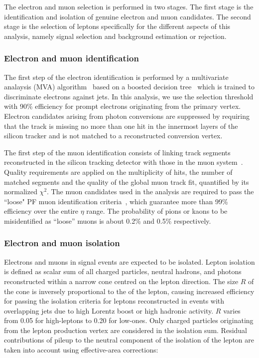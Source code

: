 The electron and muon selection is performed in two stages. The first stage is the identification and isolation of genuine electron and muon candidates. The second stage is the selection of leptons specifically for the different aspects of this analysis, namely signal selection and background estimation or rejection.

\subsubsection {Electron and muon identification}
\label{sec:basic_electronId}

The first step of the electron identification is performed by a multivariate analaysis (MVA) algorithm~\cite{Khachatryan:2015hwa,ElectronID} based on a boosted decision tree~\cite{TMVA} which is trained to discriminate electrons against jets. In this analysis, we use the selection threshold with 90\% efficiency for prompt electrons originating from the primary vertex.
Electron candidates arising from photon conversions are suppressed by requiring that the track is missing no more than one hit in the innermost layers of the silicon tracker and is not matched to a reconstructed conversion vertex.







The first step of the muon identification consists of linking track segments reconstructed in the silicon tracking detector with those in the muon system~\cite{Chatrchyan:2012xi}.
Quality requirements are applied on the multiplicity of hits, the number of matched segments and the quality of the global muon track fit, quantified by its normalized $\chi^{2}$.
The muon candidates used in the analysis are required to pass the ``loose" PF muon identification criteria~\cite{MuonID}, which guarantee more than 99\% efficiency over the entire $\eta$ range. The probability of pions or kaons to be misidentified as ``loose'' muons is about 0.2\% and 0.5\% respectively.

\subsubsection{Electron and muon isolation}
\label{sec:electronAndMuonIsolation}

Electrons and muons in signal events are expected to be isolated. Lepton isolation is defined as scalar \pt sum of all charged particles, neutral hadrons, and photons reconstructed within a narrow cone centred on the lepton direction.
The size $R$ of the cone is inversely proportional to the \pt of the lepton, causing increased efficiency for passing the isolation criteria for leptons reconstructed in events with overlapping jets due to high Lorentz boost or high hadronic activity. $R$ varies from 0.05 for high-\pt leptons to 0.20 for low-\pt ones.
Only charged particles originating from the lepton production vertex are considered in the isolation sum. Residual contributions of pileup to the neutral component of the isolation of the lepton are taken into account using effective-area corrections:

